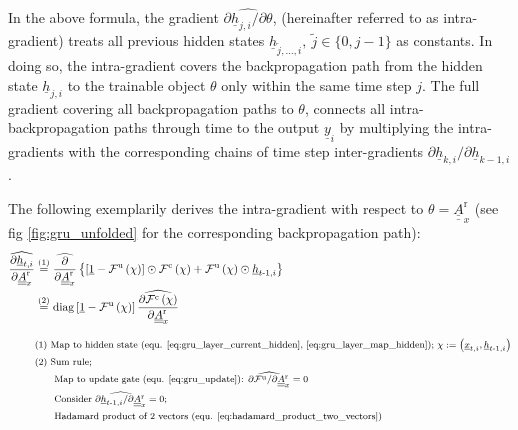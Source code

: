 In the above formula,
the gradient
$\widehat{\partial \underline h_{j, i} / \partial \theta}$,
(hereinafter referred to as intra-gradient) 
treats all previous hidden states 
$\underline h_{\tilde j,\dots, i}, \ \tilde j \in \{0, j-1\}$ as constants.
In doing so, the intra-gradient covers the backpropagation path 
from the hidden state 
$\underline h_{j, i}$
to the trainable object 
$\theta$
only within the same time step $j$.
The full gradient covering all backpropagation paths to 
$\theta$, 
connects all intra-backpropagation paths through time to the output 
$\underline y _i$ 
by multiplying the intra-gradients with the corresponding chains 
of time step inter-gradients
$\partial \underline h_{k, i}/\partial \underline h_{k-1, i}$.



The following exemplarily derives the intra-gradient with respect to
$\theta=\underline{\underline{A}}^\text{r}_x$ 
(see fig \ref{fig:gru_unfolded} for the corresponding backpropagation path):
\begin{align} \label{eq:gru_grad_intra_hidden_2_Arx}
    \widehat{\frac{\partial \underline h_{t, i}}{\partial \underline{\underline{A}}^\text{r}_x}}
    &\overset{\textcolor{black}{(1)}}{=}
    \widehat{\frac{\partial}{\partial \underline{\underline{A}}^\text{r}_x}} \left\{
        \left[
            \underline 1 
            -
            \mathcal{F}^\text{u}\left(\chi\right)
        \right]
        \odot
        \mathcal{F}^\text{c} \left(\chi\right)
        +
        \mathcal{F}^\text{u}\left(\chi\right)
        \odot
        \underline h_{t\text -1,i}
    \right\}
    \nonumber \\ &\overset{\textcolor{black}{(2)}}{=}
    \mathrm{diag} \left[
        \underline 1 
        -
        \mathcal{F}^\text{u}\left(\chi\right)
    \right]
    \widehat{
        \frac{\partial \mathcal{F}^\text{c} \left(\chi\right)}
            {\partial \underline{\underline{A}}^\text{r}_x} 
    }
    \\[2ex]
    &\textcolor{black}{\text{\footnotesize (1) 
            Map to hidden state (equ. \ref{eq:gru_layer_current_hidden}, \ref{eq:gru_layer_map_hidden}); 
            $\chi :=  \left(\underline x_{t, i}, \underline h_{t\text{-}1, i}\right)$}} \nonumber \\
    &\textcolor{black}{\text{\footnotesize (2) 
        Sum rule;
    }} \nonumber \\
    &\textcolor{black}{\text{\footnotesize \qquad
        Map to update gate (equ. \ref{eq:gru_update}): 
        $\widehat{\partial \mathcal{F}^\text{u} / \partial \underline{\underline{A}}^\text{r}_x} = 0$ 
    }} \nonumber \\
    &\textcolor{black}{\text{\footnotesize \qquad
        Consider
        $\widehat{\partial \underline h_{t\text -1, i} / \partial \underline{\underline{A}}^\text{r}_x} = 0$;
    }} \nonumber \\
    &\textcolor{black}{\text{\footnotesize \qquad
        Hadamard product of 2 vectors (equ. \ref{eq:hadamard_product_two_vectors})
    }} \nonumber
\end{align}
